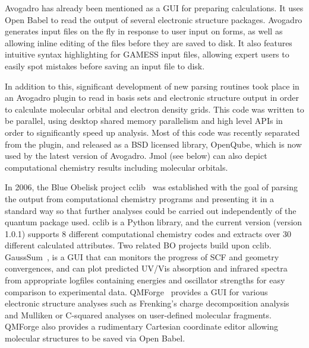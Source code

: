 \documentclass[10pt]{bmc_article}
\newenvironment{bmcformat}{\fussy\setboolean{publ}{true}}{\fussy}
\begin{document}
\begin{bmcformat}
Avogadro has already been mentioned as a GUI for preparing calculations.
It uses Open Babel to read the output of several electronic structure
packages. Avogadro generates input files on the fly in response to user
input on forms, as well as allowing inline editing of the files before
they are saved to disk. It also features intuitive syntax highlighting
for GAMESS input files, allowing expert users to easily spot mistakes
before saving an input file to disk.

In addition to this, significant development of new parsing routines took
place in an Avogadro plugin to read in basis sets and electronic structure
output in order to calculate molecular orbital and electron density grids.
This code was written to be parallel, using desktop shared memory parallelism
and high level APIs in order to significantly speed up analysis. Most of this
code was recently separated from the plugin, and released as a BSD licensed
library, OpenQube, which is now used by the latest version of
Avogadro.
Jmol (see below)
can also depict computational chemistry results including molecular orbitals.

In 2006, the Blue Obelisk project cclib~\cite{cclib} was established
with the goal of parsing the output from computational chemistry
programs and presenting it in a standard way so that further analyses
could be carried out independently of the quantum package used.
cclib is a Python library, and the current version (version 1.0.1)
supports 8 different computational chemistry codes and extracts over
30 different calculated attributes. Two related BO projects build upon 
cclib. GaussSum~\cite{WebGaussSum},
is a GUI that can monitors the progress of SCF and geometry convergences, 
and can plot predicted UV/Vis absorption and infrared spectra from 
appropriate logfiles containing energies and oscillator strengths for easy 
comparison to experimental data. QMForge~\cite{WebQMForge} provides 
a GUI for various electronic structure analyses such as Frenking's charge 
decomposition analysis~\cite{Frenking} and Mulliken or C-squared analyses
on user-defined molecular fragments. QMForge also provides a rudimentary
Cartesian coordinate editor allowing molecular structures to be saved via Open Babel.


\end{bmcformat}
\end{document}
